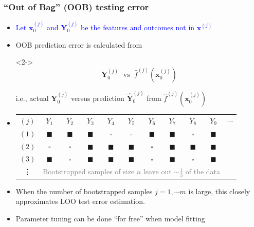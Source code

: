 \documentclass[xcolor={dvipsnames}]{beamer}
\begin{document}
\frame
{
\frametitle{``Out of Bag'' (OOB) testing error}
\begin{itemize}
\item \textcolor{blue}{Let ${\boldsymbol x}_0^{(j)}$ and ${\boldsymbol Y}_0^{(j)}$ be the features and outcomes not in ${\boldsymbol x}^{(j)}$}
\item<2-> OOB  prediction error is calculated from 
\item[]<2-> $${\boldsymbol Y}_0^{(j)} \;\text{ vs }\; \hat f^{(j)}\left({\boldsymbol x}_0^{(j)}\right)$$

i.e.,  actual ${\boldsymbol Y}_0^{(j)}$ versus prediction $\hat {\boldsymbol Y}_0^{(j)}$ from $\hat f^{(j)}\left({\boldsymbol x}_0^{(j)}\right)$
\end{itemize}
\begin{itemize}
\item<3->[]
\begin{tabular}{c|cccccccccc}
${(j)}$&$Y_1$&$Y_2$&$Y_3$&$Y_4$&$Y_5$&$Y_6$&$Y_7$&$Y_8$&$Y_9$&$\cdots$\\
${(1)}$&$\blacksquare$&$\blacksquare$&$\blacksquare$&$\square$&$\square$&$\blacksquare$&$\blacksquare$&$\square$&$\blacksquare$&\\
${(2)}$&$\square$&$\square$&$\blacksquare$&$\blacksquare$&$\blacksquare$&$\square$&$\blacksquare$&$\blacksquare$&$\blacksquare$&\\
${(3)}$&$\blacksquare$&$\square$&$\blacksquare$&$\blacksquare$&$\blacksquare$&$\square$&$\blacksquare$&$\square$&$\blacksquare$&\\
\vdots & \multicolumn{9}{c}{
\textcolor{gray}{\scriptsize Bootstrapped samples of size $n$ leave out $\sim \frac{1}{3}$ of the data}} \\
\end{tabular}



\item<4-> When the number of bootstrapped samples $ j = 1, \cdots m$ is large,
this closely approximates LOO test error estimation.
\item<5-> Parameter tuning can be done ``for free'' when model fitting 
\end{itemize}
\vspace{.075in}

}
\end{document}
